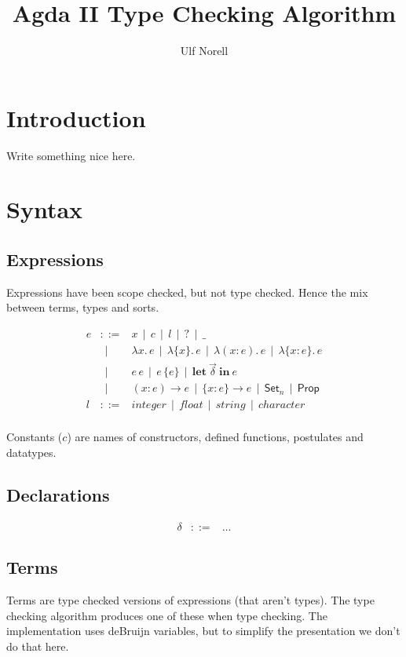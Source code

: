 \documentclass[a4paper,11pt]{article}
\title{Agda II Type Checking Algorithm}
\author{Ulf Norell}
\newcommand\keyword[1]{\mathbf{#1}}
\newcommand\Coloneqq{\mathrel{::=}}
\newcommand\OR{~~|~~}
\newcommand\Hid[1]{\{#1\}}
\newcommand\lam[1]{\lambda#1.\,}
\newcommand\hlam[1]{\lam{\Hid{#1}}}
\newcommand\tlam[2]{\lam{(#1:#2)}}
\newcommand\thlam[2]{\lam{\Hid{#1:#2}}}
\newcommand\ePi[3]{(#1:#2)\to#3}
\newcommand\ehPi[3]{\{#1:#2\}\to#3}
\newcommand\Let[2]{\keyword{let}~#1~\keyword{in}~#2}
\newcommand\Set[1]{\mathsf{Set}_#1}
\newcommand\Prop{\mathsf{Prop}}
\begin{document}
\maketitle

\section{Introduction}

    Write something nice here.

\section{Syntax}

\subsection{Expressions}

    Expressions have been scope checked, but not type checked. Hence the mix
    between terms, types and sorts.

    \[\begin{array}{lcl}
	e & \Coloneqq & x \OR c \OR l \OR ? \OR \_ \\
	  & \OR & \lam xe \OR \hlam xe \OR \tlam xee \OR \thlam xee \\
	  & \OR & e\,e \OR e\,\Hid e \OR \Let{\vec\delta}e \\
	  & \OR & \ePi xee \OR \ehPi xee \OR \Set n \OR \Prop \\
	l & \Coloneqq & \mathit{integer} \OR \mathit{float} \OR \mathit{string} \OR \mathit{character} \\
    \end{array}\]

    Constants ($c$) are names of constructors, defined functions, postulates and datatypes.

\subsection{Declarations}

    \[\begin{array}{lcl}
	\delta & \Coloneqq & \ldots
    \end{array}\]

\subsection{Terms}

    Terms are type checked versions of expressions (that aren't types). The
    type checking algorithm produces one of these when type checking. The
    implementation uses deBruijn variables, but to simplify the presentation
    we don't do that here.
\end{document}
